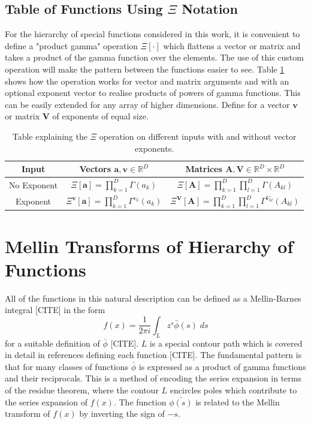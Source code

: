 \documentclass{article}
\begin{document}
\subsection{Table of Functions Using $\Xi$ Notation}
For the hierarchy of special functions considered in this work, it is convenient to define a "product gamma" operation $\Xi[\cdot]$ which flattens a vector or matrix and takes a product of the gamma function over the elements. The use of this custom operation will make the pattern between the functions easier to see. Table \ref{tab:Xi} shows how the operation works for vector and matrix arguments and with an optional exponent vector to realise products of powers of gamma functions. This can be easily extended for any array of higher dimensions. Define for a vector $\mathbf{v}$ or matrix $\mathbf{V}$ of exponents of equal size.
\begin{table}
\begin{tabular}{|c|c|c|}
\hline
Input & Vectors $\mathbf{a,v} \in \mathbb{R}^D$ & Matrices $\mathbf{A,V} \in \mathbb{R}^D\times \mathbb{R}^D$ \\
\hline
No Exponent & $\Xi[\mathbf{a}] = \prod_{k=1}^D \Gamma(a_k)$ & $\Xi[\mathbf{A}] = \prod_{k=1}^D\prod_{l=1}^D \Gamma(A_{kl})$ \\
Exponent & $\Xi^\mathbf{v}[\mathbf{a}] = \prod_{k=1}^D \Gamma^{v_k}(a_k)$ & $\Xi^\mathbf{V}[\mathbf{A}] = \prod_{k=1}^D\prod_{l=1}^D \Gamma^{V_{kl}}(A_{kl})$\\
\hline
\end{tabular}
\caption{Table explaining the $\Xi$ operation on different inputs with and without vector exponents.}
\label{tab:Xi}
\end{table}

\section{Mellin Transforms of Hierarchy of Functions}
All of the functions in this natural description can be defined as a Mellin-Barnes integral [CITE] in the form
\begin{equation}
f(x) = \frac{1}{2\pi i}\int_L z^s \bar{\phi}(s)\;ds
\end{equation}
for a suitable definition of $\bar{\phi}$ [CITE]. $L$ is a special contour path which is covered in detail in references defining each function [CITE]. The fundamental pattern is that for many classes of functions $\bar{\phi}$ is expressed as a product of gamma functions and their reciprocals. This is a method of encoding the series expansion in terms of the residue theorem, where the contour $L$ encircles poles which contribute to the series expansion of $f(x)$. The function $\bar{\phi(s)}$ is related to the Mellin transform of $f(x)$ by inverting the sign of $-s$. 
\end{document}
